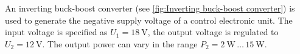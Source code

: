 

An inverting buck-boost converter (see \autoref{fig:Inverting buck-boost converter}) is used to generate the negative supply voltage of a control electronic unit. The input voltage is specified as $U_\mathrm{1}=\SI{18}{\volt}$, the output voltage is regulated to $U_\mathrm{2}=\SI{12}{\volt}$. The output power can vary in the range $P_\mathrm{2} = \SI{2}{\watt} \, \dots \, \SI{15}{\watt}$.




